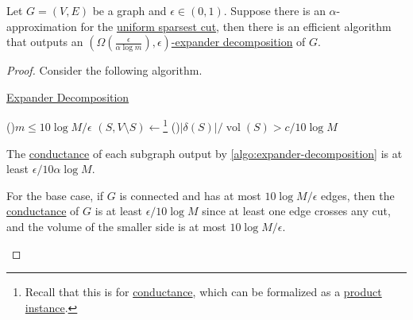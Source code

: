 \begin{theorem}\label{thm:expander-decomposition}
	Let \(G=(V, E)\) be a graph and \(\epsilon \in (0, 1)\). Suppose there is an \(\alpha \)-approximation for the \hyperref[prb:sparsest-cut]{uniform sparsest cut}, then there is an efficient algorithm that outputs an \hyperref[def:expander-decomposition]{\((\Omega (\frac{\epsilon }{\alpha \log m}), \epsilon )\)-expander decomposition} of \(G\).
\end{theorem}
\begin{proof}
	Consider the following algorithm.

	\begin{algorithm}[H]\label{algo:expander-decomposition}
		\DontPrintSemicolon{}
		\caption{\hyperref[def:expander-decomposition]{Expander Decomposition}}

		\BlankLine

		\If(){\(m \leq 10 \log M / \epsilon \)}{
			\;
		}
		\;
		\((S, V\setminus S) \gets\)\footnote{Recall that this is for \hyperref[def:conductance]{conductance}, which can be formalized as a \hyperref[prb:product-instance-of-sparsest-cut]{product instance}.}
		\;
		\uIf(){\(\lvert \delta (S) \rvert / \operatorname{vol}(S) > c / 10 \log M\)}{
			\;
		}
	\end{algorithm}

	\begin{claim}
		The \hyperref[def:conductance]{conductance} of each subgraph output by \autoref{algo:expander-decomposition} is at least \(\epsilon / 10 \alpha \log M\).
	\end{claim}
	\begin{explanation}
		For the base case, if \(G\) is connected and has at most \(10 \log M / \epsilon \) edges, then the \hyperref[def:conductance]{conductance} of \(G\) is at least \(\epsilon / 10 \log M\) since at least one edge crosses any cut, and the volume of the smaller side is at most \(10 \log M / \epsilon \).


\end{explanation}
\end{proof}
